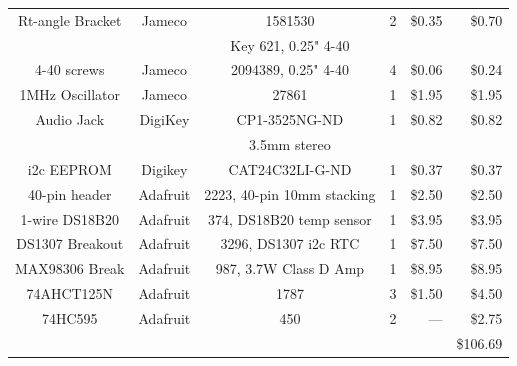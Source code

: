 \documentclass[11pt]{article}
\begin{document}
\begin{table}[thp]
\begin{tabular}{|c|c|c|c|r|r|}
\hline
Rt-angle Bracket& Jameco	& 1581530		  & 2	&  \$0.35  &  \$0.70 \\
		&		& Key 621, 0.25" 4-40	  &	&          &         \\
\hline
4-40 screws	& Jameco	& 2094389, 0.25" 4-40	  & 4	&  \$0.06  &  \$0.24 \\
\hline
1MHz Oscillator	& Jameco	& 27861			  & 1	& \$1.95   &  \$1.95 \\
\hline
Audio Jack	& DigiKey	& CP1-3525NG-ND	          & 1	&  \$0.82  &  \$0.82 \\
		&		& 3.5mm stereo		  &	&	   &	     \\
\hline
i2c EEPROM	& Digikey 	& CAT24C32LI-G-ND         & 1 	& \$0.37   &  \$0.37 \\
\hline
40-pin header	& Adafruit	& 2223, 40-pin 10mm stacking & 1	&  \$2.50  &  \$2.50 \\
\hline
1-wire DS18B20	& Adafruit	& 374, DS18B20 temp sensor& 1	&  \$3.95  &  \$3.95 \\
\hline
DS1307 Breakout	& Adafruit	& 3296, DS1307 i2c RTC	  & 1	&  \$7.50  &  \$7.50 \\
\hline
MAX98306 Break	& Adafruit	& 987, 3.7W Class D Amp   & 1	&  \$8.95  &  \$8.95 \\
\hline
74AHCT125N	& Adafruit	& 1787			  & 3	&  \$1.50  &  \$4.50 \\
\hline
74HC595		& Adafruit	& 450			  & 2	&  ---     &  \$2.75 \\
\hline
\hline
		&		&		&	&		& \$106.69 \\
\hline
\end{tabular}
\end{table}
\end{document}
